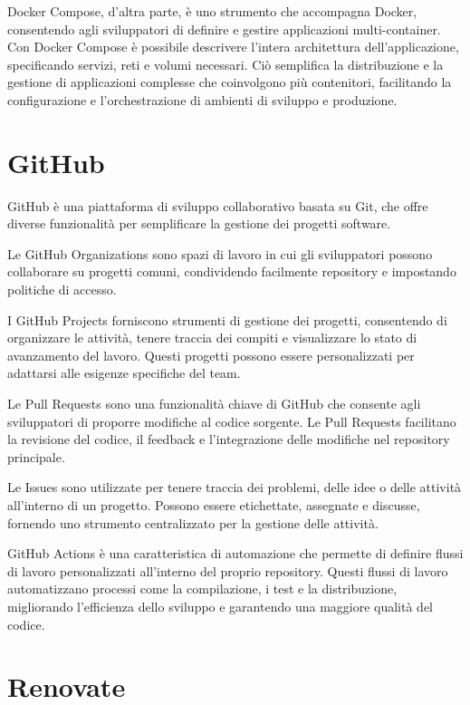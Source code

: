 \documentclass[12pt,a4paper,openright,twoside]{book}
\begin{document}
Docker Compose, d'altra parte, è uno strumento che accompagna Docker, consentendo agli sviluppatori di definire e gestire applicazioni multi-container. Con Docker Compose è possibile descrivere l'intera architettura dell'applicazione, specificando servizi, reti e volumi necessari. Ciò semplifica la distribuzione e la gestione di applicazioni complesse che coinvolgono più contenitori, facilitando la configurazione e l'orchestrazione di ambienti di sviluppo e produzione.

\section{GitHub}

GitHub è una piattaforma di sviluppo collaborativo basata su Git, che offre diverse funzionalità per semplificare la gestione dei progetti software.

Le GitHub Organizations sono spazi di lavoro in cui gli sviluppatori possono collaborare su progetti comuni, condividendo facilmente repository e impostando politiche di accesso.

I GitHub Projects forniscono strumenti di gestione dei progetti, consentendo di organizzare le attività, tenere traccia dei compiti e visualizzare lo stato di avanzamento del lavoro. Questi progetti possono essere personalizzati per adattarsi alle esigenze specifiche del team.

Le Pull Requests sono una funzionalità chiave di GitHub che consente agli sviluppatori di proporre modifiche al codice sorgente. Le Pull Requests facilitano la revisione del codice, il feedback e l'integrazione delle modifiche nel repository principale.

Le Issues sono utilizzate per tenere traccia dei problemi, delle idee o delle attività all'interno di un progetto. Possono essere etichettate, assegnate e discusse, fornendo uno strumento centralizzato per la gestione delle attività.

GitHub Actions è una caratteristica di automazione che permette di definire flussi di lavoro personalizzati all'interno del proprio repository. Questi flussi di lavoro automatizzano processi come la compilazione, i test e la distribuzione, migliorando l'efficienza dello sviluppo e garantendo una maggiore qualità del codice.

\section{Renovate}
\end{document}
